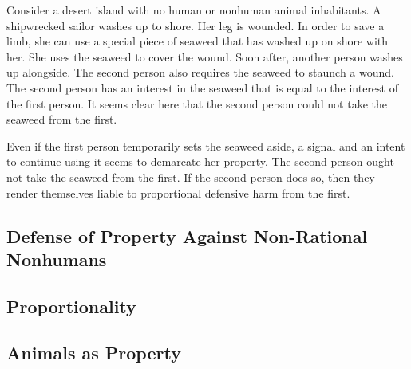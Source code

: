 \documentclass[12pt]{article}
\begin{document}
	Consider a desert island with no human or nonhuman animal inhabitants.
	A shipwrecked sailor washes up to shore. Her leg is wounded. In order to
	save a limb, she can use a special piece of seaweed that has washed up on
	shore with her. She uses the seaweed to cover the wound. Soon after, another
	person washes up alongside. The second person also requires the seaweed to
	staunch a wound. The second person has an interest in the seaweed that is
	equal to the interest of the first person. It seems clear here that the
	second person could not take the seaweed from the first.

	Even if the first person temporarily sets the seaweed aside, a signal and
	an intent to continue using it seems to demarcate her property. The second
	person ought not take the seaweed from the first. If the second person does
	so, then they render themselves liable to proportional defensive harm from
	the first.

	\subsection{Defense of Property Against Non-Rational Nonhumans}

	\subsection{Proportionality}
	\subsection{Animals as Property}
\end{document}
